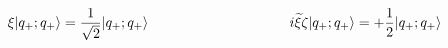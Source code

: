 \begin{equation}
\label{pp}
\xi|q_+;q_+ \rangle=\frac{1}{\sqrt{2}}|q_+;q_+ \rangle
\hspace{1.4in}
i{\widetilde \xi}\zeta|q_+;q_+ \rangle=+\frac{1}{2}|q_+;q_+ 
\rangle
\end{equation}

